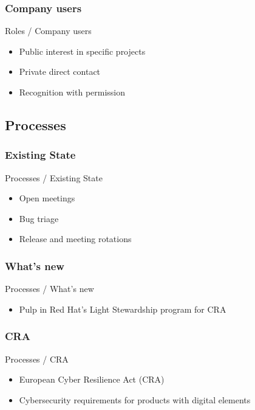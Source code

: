 \documentclass[aspectratio=169]{beamer}
\begin{document}
\subsubsection{Company users}
\begin{frame}{Roles / Company users}
  \Large
  \begin{itemize}
    \setlength{\itemsep}{1em}
    \item Public interest in specific projects
    \item Private direct contact
    \item Recognition with permission
  \end{itemize}
\end{frame}

\subsection{Processes}
\subsubsection{Existing State}
\begin{frame}{Processes / Existing State}
  \Large
  \begin{itemize}
    \setlength{\itemsep}{1em}
    \item Open meetings
    \item Bug triage
    \item Release and meeting rotations
  \end{itemize}
\end{frame}

\subsubsection{What's new}
\begin{frame}{Processes / What's new}
  \Large
  \begin{itemize}
    \item Pulp in Red Hat's Light Stewardship program for CRA
  \end{itemize}
\end{frame}

\subsubsection{CRA}
\begin{frame}{Processes / CRA}
  \Large
  \begin{itemize}
    \setlength{\itemsep}{1em}
    \item European Cyber Resilience Act (CRA)
    \item Cybersecurity requirements for products with digital elements
  \end{itemize}
\end{frame}
\end{document}
